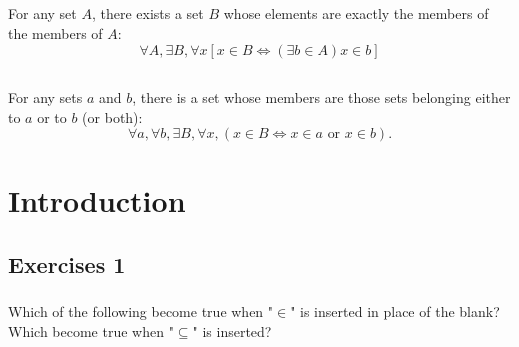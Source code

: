 \documentclass{report}
\begin{document}

\section{}%

  For any set $A$, there exists a set $B$ whose elements are exactly the members
    of the members of $A$:
    $$\forall A, \exists B, \forall x
      \left[ x \in B \iff (\exists b \in A) x \in b \right]$$


\section{}%

  For any sets $a$ and $b$, there is a set whose members are those sets
    belonging either to $a$ or to $b$ (or both):
    $$\forall a, \forall b, \exists B, \forall x,
        (x \in B \iff x \in a \text{ or } x \in b).$$


\endgroup

\chapter{Introduction}%

\section{Exercises 1}%

\subsection{}%

  Which of the following become true when "$\in$" is inserted in place of the
    blank?
  Which become true when "$\subseteq$" is inserted?

\subsubsection{}%
\end{document}
